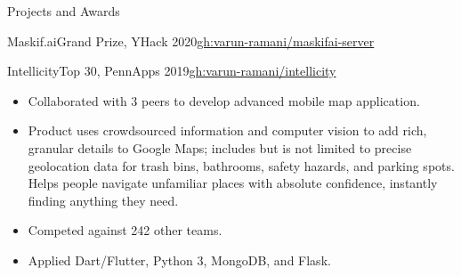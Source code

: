 \documentclass[]{mcdowellcv}
\begin{document}
\begin{cvsection}{Projects and Awards}
\begin{cvsubsection}{Maskif.ai}{Grand Prize, YHack 2020}{\href{https://github.com/varun-ramani/maskifai-server}{gh:varun-ramani/maskifai-server}}
\begin{itemize}
			\end{itemize}
		\end{cvsubsection}
        \begin{cvsubsection}{Intellicity}{Top 30, PennApps 2019}{\href{https://github.com/varun-ramani/intellicity}{gh:varun-ramani/intellicity}}
			\begin{itemize}
				\item Collaborated with 3 peers to develop advanced mobile map application.
				\item Product uses crowdsourced information and computer vision to add rich, granular details
				to Google Maps; includes but is not limited to precise geolocation data for trash bins, bathrooms, 
				safety hazards, and parking spots. Helps people navigate unfamiliar
				places with absolute confidence, instantly finding anything they need. 
				\item Competed against 242 other teams.
				\item Applied Dart/Flutter, Python 3, MongoDB, and Flask.
			\end{itemize}
		\end{cvsubsection}
	\end{cvsection}
\end{document}
